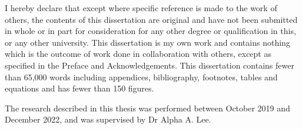 
\begin{declaration}

I hereby declare that except where specific reference is made to the work of others, the contents of this dissertation are original and have not been submitted in whole or in part for consideration for any other degree or qualification in this, or any other university. This dissertation is my own work and contains nothing which is the outcome of work done in collaboration with others, except as specified in the Preface and Acknowledgements. This  dissertation contains fewer than 65,000 words including appendices,  bibliography, footnotes, tables and equations and has fewer than 150 figures.

The research described in this thesis was performed between October 2019 and December 2022, and was supervised by Dr Alpha A. Lee.

\end{declaration}